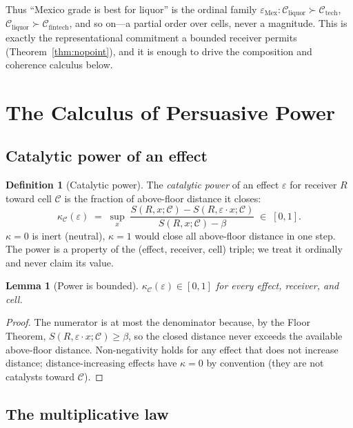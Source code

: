 \documentclass[twocolumn,11pt,a4paper]{article}
\theoremstyle{adv}
\newtheorem{lemma}[theorem]{Lemma}
\theoremstyle{definition}
\newtheorem{definition}[theorem]{Definition}
\theoremstyle{remark}
\newcommand{\Cell}{\mathcal{C}}        %
\newcommand{\Recv}{R}                  %
\newcommand{\Sval}{S}                  %
\newcommand{\floor}{\beta}            %
\newcommand{\Eff}{\varepsilon}        %
\newcommand{\pot}{\kappa}             %
\begin{document}
Thus ``Mexico grade is best for liquor'' is the ordinal family
$\Eff_{\text{Mex}}:\Cell_{\text{liquor}}\succ\Cell_{\text{tech}}$,
$\Cell_{\text{liquor}}\succ\Cell_{\text{fintech}}$, and so on---a partial
order over cells, never a magnitude. This is exactly the representational
commitment a bounded receiver permits (Theorem~\ref{thm:nopoint}), and it
is enough to drive the composition and coherence calculus below.

\section{The Calculus of Persuasive Power}
\label{sec:power}

\subsection{Catalytic power of an effect}

\begin{definition}[Catalytic power]
\label{def:power}
The \emph{catalytic power} of an effect $\Eff$ for receiver $\Recv$ toward
cell $\Cell$ is the fraction of above-floor distance it closes:
\[
  \pot_\Cell(\Eff)\;=\;\sup_{x}\;
  \frac{\Sval(\Recv,x;\Cell)-\Sval(\Recv,\Eff\!\cdot x;\Cell)}
       {\Sval(\Recv,x;\Cell)-\floor}\;\in\;[0,1].
\]
$\pot=0$ is inert (neutral), $\pot=1$ would close all above-floor distance
in one step. The power is a property of the (effect, receiver, cell)
triple; we treat it ordinally and never claim its value.
\end{definition}

\begin{lemma}[Power is bounded]
\label{lem:powerbound}
$\pot_\Cell(\Eff)\in[0,1]$ for every effect, receiver, and cell.
\end{lemma}

\begin{proof}
The numerator is at most the denominator because, by the Floor Theorem,
$\Sval(\Recv,\Eff\!\cdot x;\Cell)\ge\floor$, so the closed distance never
exceeds the available above-floor distance. Non-negativity holds for any
effect that does not increase distance; distance-increasing effects have
$\pot=0$ by convention (they are not catalysts toward $\Cell$).
\end{proof}

\subsection{The multiplicative law}
\end{document}
